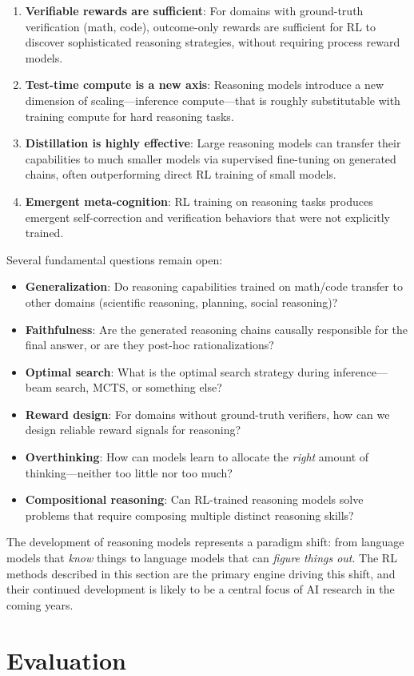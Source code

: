 \begin{enumerate}
  \item \textbf{Verifiable rewards are sufficient}: For domains with ground-truth verification (math, code), outcome-only rewards are sufficient for RL to discover sophisticated reasoning strategies, without requiring process reward models.
  \item \textbf{Test-time compute is a new axis}: Reasoning models introduce a new dimension of scaling---inference compute---that is roughly substitutable with training compute for hard reasoning tasks.
  \item \textbf{Distillation is highly effective}: Large reasoning models can transfer their capabilities to much smaller models via supervised fine-tuning on generated chains, often outperforming direct RL training of small models.
  \item \textbf{Emergent meta-cognition}: RL training on reasoning tasks produces emergent self-correction and verification behaviors that were not explicitly trained.
\end{enumerate}

\begin{questionbox}
Several fundamental questions remain open:

\begin{itemize}
  \item \textbf{Generalization}: Do reasoning capabilities trained on math/code transfer to other domains (scientific reasoning, planning, social reasoning)?
  \item \textbf{Faithfulness}: Are the generated reasoning chains causally responsible for the final answer, or are they post-hoc rationalizations?
  \item \textbf{Optimal search}: What is the optimal search strategy during inference---beam search, MCTS, or something else?
  \item \textbf{Reward design}: For domains without ground-truth verifiers, how can we design reliable reward signals for reasoning?
  \item \textbf{Overthinking}: How can models learn to allocate the \emph{right} amount of thinking---neither too little nor too much?
  \item \textbf{Compositional reasoning}: Can RL-trained reasoning models solve problems that require composing multiple distinct reasoning skills?
\end{itemize}
\end{questionbox}

The development of reasoning models represents a paradigm shift: from language models that \emph{know} things to language models that can \emph{figure things out}. The RL methods described in this section are the primary engine driving this shift, and their continued development is likely to be a central focus of AI research in the coming years.

\part{Evaluation}

